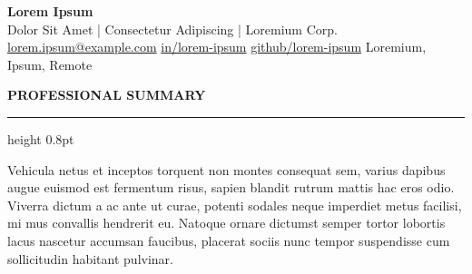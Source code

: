 \documentclass[10pt, a4paper]{article}
\newcommand{\cvsection}[1]{%
  \vspace{10pt}%
  {\color{accent}\small\bfseries\MakeUppercase{#1}}%
  \par\nobreak\vspace{2pt}%
  {\color{accent!50}\hrule height 0.8pt}%
  \vspace{5pt}%
}
\begin{document}
\begin{center}
  {\fontsize{28}{32}\bfseries\selectfont\color{textmain} Lorem Ipsum}\\[5pt]
  {\color{textmuted}\large Dolor Sit Amet | Consectetur Adipiscing | Loremium Corp.}\\[7pt]
  {\small\color{textmuted}
    \href{mailto:lorem.ipsum@example.com}{lorem.ipsum@example.com}
    \quad\textperiodcentered\quad
    \href{https://www.linkedin.com/in/lorem-ipsum/}{in/lorem-ipsum}
    \quad\textperiodcentered\quad
    \href{https://github.com/lorem-ipsum}{github/lorem-ipsum}
    \quad\textperiodcentered\quad
    Loremium, Ipsum, Remote
  }
\end{center}

\cvsection{Professional Summary}

{\color{textmain}
Vehicula netus et inceptos torquent non montes consequat sem, varius dapibus augue euismod est fermentum risus, sapien blandit rutrum mattis hac eros odio. Viverra dictum a ac ante ut curae, potenti sodales neque imperdiet metus facilisi, mi mus convallis hendrerit eu. Natoque ornare dictumst semper tortor lobortis lacus nascetur accumsan faucibus, placerat sociis nunc tempor suspendisse cum sollicitudin habitant pulvinar.
}
\end{document}
